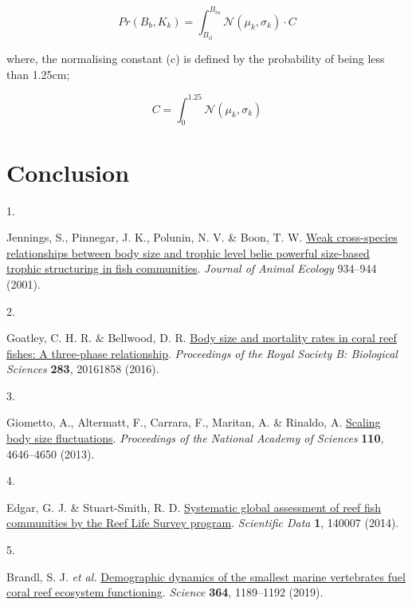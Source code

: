 \documentclass[
]{agujournal2019}
\newlength{\cslhangindent}
\newlength{\csllabelwidth}
\newlength{\cslentryspacingunit} %
\newenvironment{CSLReferences}[2] %
 {%
  \setlength{\parindent}{0pt}
  \ifodd #1
  \let\oldpar\par
  \def\par{\hangindent=\cslhangindent\oldpar}
  \fi
  \setlength{\parskip}{#2\cslentryspacingunit}
 }%
 {}
\newcommand{\CSLLeftMargin}[1]{\parbox[t]{\csllabelwidth}{#1}}
\newcommand{\CSLRightInline}[1]{\parbox[t]{\linewidth - \csllabelwidth}{#1}\break}
\begin{document}
\[
Pr(B_b,K_k) = \int_{B_{il}}^{B_{iu}}\mathcal{N}(\mu_k, \sigma_k)\cdot C
\]

where, the normalising constant (c) is defined by the probability of
being less than 1.25cm;

\[
C = \int_{0}^{1.25}\mathcal{N}(\mu_k, \sigma_k)
\]

\hypertarget{conclusion}{%
\section{Conclusion}\label{conclusion}}

\hypertarget{refs}{}
\begin{CSLReferences}{0}{0}
\vspace{1em}

\leavevmode{}%
\CSLLeftMargin{1. }%
\CSLRightInline{Jennings, S., Pinnegar, J. K., Polunin, N. V. \& Boon,
T. W. \href{https://www.jstor.org/stable/2693497}{Weak cross-species
relationships between body size and trophic level belie powerful
size-based trophic structuring in fish communities}. \emph{Journal of
Animal Ecology} 934--944 (2001).}

\leavevmode{}%
\CSLLeftMargin{2. }%
\CSLRightInline{Goatley, C. H. R. \& Bellwood, D. R.
\href{https://doi.org/10.1098/rspb.2016.1858}{Body size and mortality
rates in coral reef fishes: A three-phase relationship}.
\emph{Proceedings of the Royal Society B: Biological Sciences}
\textbf{283}, 20161858 (2016).}

\leavevmode{}%
\CSLLeftMargin{3. }%
\CSLRightInline{Giometto, A., Altermatt, F., Carrara, F., Maritan, A. \&
Rinaldo, A. \href{https://doi.org/10.1073/pnas.1301552110}{Scaling body
size fluctuations}. \emph{Proceedings of the National Academy of
Sciences} \textbf{110}, 4646--4650 (2013).}

\leavevmode{}%
\CSLLeftMargin{4. }%
\CSLRightInline{Edgar, G. J. \& Stuart-Smith, R. D.
\href{https://doi.org/10.1038/sdata.2014.7}{Systematic global assessment
of reef fish communities by the {Reef} {Life} {Survey} program}.
\emph{Scientific Data} \textbf{1}, 140007 (2014).}

\leavevmode{}%
\CSLLeftMargin{5. }%
\CSLRightInline{Brandl, S. J. \emph{et al.}
\href{https://doi.org/10.1126/science.aav3384}{Demographic dynamics of
the smallest marine vertebrates fuel coral reef ecosystem functioning}.
\emph{Science} \textbf{364}, 1189--1192 (2019).}


\end{CSLReferences}
\end{document}
